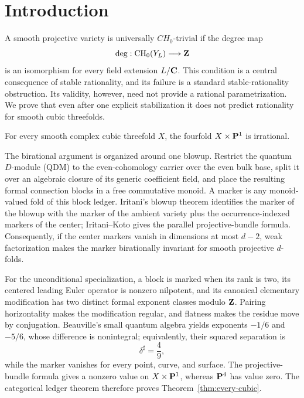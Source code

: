 \section{Introduction}

A smooth projective variety is universally \(CH_0\)-trivial if the degree map
\[
  \deg:\operatorname{CH}_0(Y_L)\longrightarrow\mathbf Z
\]
is an isomorphism for every field extension \(L/\mathbf C\).  This condition is a
central consequence of stable rationality, and its failure is a standard
stable-rationality obstruction.  Its validity, however, need not provide a
rational parametrization.  We prove that even after one explicit
stabilization it does not predict rationality for smooth cubic threefolds.

\begin{theorem}
\label{thm:every-cubic}
%
%
For every smooth complex cubic threefold \(X\), the fourfold
\(X\times\mathbf P^1\) is irrational.
\end{theorem}

The birational argument is organized around one blowup.  Restrict the quantum
\(D\)-module (QDM) to
the even-cohomology carrier over the even bulk base, split it over an algebraic
closure of its generic coefficient field, and place the resulting formal
connection blocks in a free commutative monoid.  A marker is any monoid-valued
fold of this block ledger.  Iritani's blowup theorem identifies the marker of the blowup
with the marker of the ambient variety plus the occurrence-indexed markers
of the center; Iritani--Koto gives the parallel projective-bundle formula.
Consequently, if the center markers vanish in dimensions at most \(d-2\),
weak factorization makes the marker birationally invariant for smooth
projective \(d\)-folds.

For the unconditional specialization, a block is marked when its rank is
two, its centered leading Euler operator is nonzero nilpotent, and its
canonical elementary modification has two distinct formal exponent classes
modulo \(\mathbf Z\).  Pairing horizontality makes the modification regular, and
flatness makes the residue move by conjugation.  Beauville's small quantum
algebra yields exponents \(-1/6\) and \(-5/6\), whose difference is
nonintegral; equivalently, their squared separation is
\[
  \delta^\sharp=\frac49,
\]
while the marker vanishes for every point, curve, and surface.  The
projective-bundle formula gives a nonzero value on \(X\times\mathbf P^1\), whereas
\(\mathbf P^4\) has value zero.  The categorical ledger theorem therefore proves
Theorem~\ref{thm:every-cubic}.

